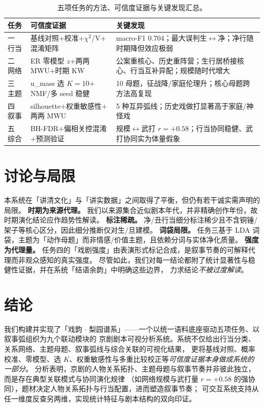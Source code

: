 \documentclass[journal]{vgtc}
\begin{document}
\begin{table}[tb]
 \caption{五项任务的方法、可信度证据与关键发现汇总。}
 \label{tab:summary}
 \scriptsize
 \centering
 \begin{tabular}{@{}p{}p{}p{}@{}}
  \toprule
  任务 & 可信度证据 & 关键发现 \\
  \midrule
  一 行当 & 基线对照$+$校准$+$$\chi^2$/V$+$混淆矩阵 & macro-F1 0.704；最大误判生$\leftrightarrow$净；净行随时期降但效应极弱 \\
  二 网络 & ER 零模型 $z$$+$两两 MWU$+$时期 KW & 公案重核心、历史重阵营；生行居桥接核心、行当互补异配；规模随时代增大 \\
  三 主题 & u\_mass 选 $K{=}10$$+$NMF/多 seed 稳健 & 10 母题，征战降/家庭伦理升；核心母题跨方法高复现 \\
  四 叙事 & silhouette$+$权重敏感性$+$两两 MWU & 5 种互异弧线；历史戏做打显著高于家庭/神怪戏 \\
  五 综合 & BH-FDR$+$偏相关控混淆$+$预测验证 & 规模$\leftrightarrow$武打 $r{=}{+}0.58$；行当协同稳健、武打协同实为体量假象 \\
  \bottomrule
 \end{tabular}
\end{table}

\section{讨论与局限}
本系统在「讲清文化」与「讲实数据」之间取得了平衡，但仍有若干诚实需声明的局限。
\textbf{时期为来源代理。} 我们以来源集合近似剧本年代，并非精确创作年份，故时期演化结论应作趋势性解读。
\textbf{标注稀疏。} 净/丑行当细分标注稀少且不含铜锤/架子等核心区分，因此细分推断仅对生/旦建模。
\textbf{词袋局限。} 任务三基于 LDA 词袋，主题为「动作母题」而非情感/价值主题，且依赖分词与实体净化质量。
\textbf{强度为代理量。} 任务四的「戏剧强度」由表演形式标记合成，是叙事节奏的可解释代理而非观众感知的真实强度。
尽管如此，我们对每一结论都附了统计显著性与稳健性证据，并在系统「结语余韵」中明确这些边界，
力求结论\emph{不被过度解读}。

\section{结论}
我们构建并实现了「戏韵 $\cdot$ 梨园谱系」——一个以统一语料底座驱动五项任务、以叙事弧组织为九个联动模块的
京剧剧本可视分析系统。系统不仅给出行当分类、关系网络、主题母题、叙事弧线与综合关联的可视化结果，
更将基线对照、概率校准、零模型、选 $K$、权重敏感性与多重比较校正等\emph{可信度证据本身做成系统的一部分}。
分析表明，京剧的人物关系拓扑、主题母题与叙事节奏并非彼此独立，而是存在典型关联模式与协同演化规律
（如网络规模与武打量 $r{=}{+}0.58$ 的强协同），题材决定人物关系拓扑与行当配置，进而塑造叙事节奏；
可交互系统支持从任一维度反查另两维，实现统计特征与剧本结构的双向印证。




\end{document}
